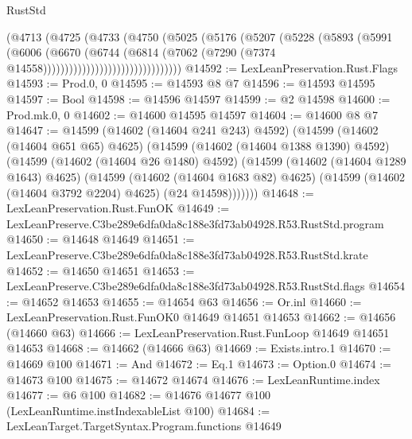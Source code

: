 \begin{lexlean}{RustStd}
\begin{coremodule}
                                  (@4713
                                    (@4725
                                      (@4733
                                        (@4750
                                          (@5025
                                            (@5176
                                              (@5207
                                                (@5228
                                                  (@5893
                                                    (@5991
                                                      (@6006
                                                        (@6670
                                                          (@6744
                                                            (@6814
                                                              (@7062
                                                                (@7290
                                                                  (@7374
                                                                    @14558))))))))))))))))))))))))))))))))
@14592 := LexLeanPreservation.Rust.Flags
@14593 := Prod.{0, 0}
@14595 := @14593 @8 @7
@14596 := @14593 @14595
@14597 := Bool
@14598 := @14596 @14597
@14599 := @2 @14598
@14600 := Prod.mk.{0, 0}
@14602 := @14600 @14595 @14597
@14604 := @14600 @8 @7
@14647 := @14599
    (@14602 (@14604 @241 @243) @4592)
    (@14599
      (@14602 (@14604 @651 @65) @4625)
      (@14599
        (@14602 (@14604 @1388 @1390) @4592)
        (@14599
          (@14602 (@14604 @26 @1480) @4592)
          (@14599
            (@14602 (@14604 @1289 @1643) @4625)
            (@14599
              (@14602 (@14604 @1683 @82) @4625)
              (@14599 (@14602 (@14604 @3792 @2204) @4625) (@24 @14598)))))))
@14648 := LexLeanPreservation.Rust.FunOK
@14649 := LexLeanPreserve.C3be289e6dfa0da8c188e3fd73ab04928.R53.RustStd.program
@14650 := @14648 @14649
@14651 := LexLeanPreserve.C3be289e6dfa0da8c188e3fd73ab04928.R53.RustStd.krate
@14652 := @14650 @14651
@14653 := LexLeanPreserve.C3be289e6dfa0da8c188e3fd73ab04928.R53.RustStd.flags
@14654 := @14652 @14653
@14655 := @14654 @63
@14656 := Or.inl
@14660 := LexLeanPreservation.Rust.FunOK0 @14649 @14651 @14653
@14662 := @14656 (@14660 @63)
@14666 := LexLeanPreservation.Rust.FunLoop @14649 @14651 @14653
@14668 := @14662 (@14666 @63)
@14669 := Exists.intro.{1}
@14670 := @14669 @100
@14671 := And
@14672 := Eq.{1}
@14673 := Option.{0}
@14674 := @14673 @100
@14675 := @14672 @14674
@14676 := LexLeanRuntime.index
@14677 := @6 @100
@14682 := @14676 @14677 @100 (LexLeanRuntime.instIndexableList @100)
@14684 := LexLeanTarget.TargetSyntax.Program.functions @14649

\end{coremodule}
\end{lexlean}
